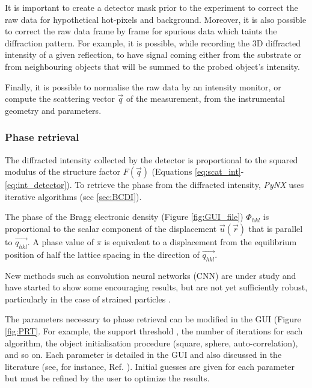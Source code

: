 It is important to create a detector mask prior to the experiment to correct the raw data for hypothetical hot-pixels and background.
Moreover, it is also possible to correct the raw data frame by frame for spurious data which taints the diffraction pattern.
For example, it is possible, while recording the 3D diffracted intensity of a given reflection, to have signal coming either from the substrate or from neighbouring objects that will be summed to the probed object's intensity.

Finally, it is possible to normalise the raw data by an intensity monitor, or compute the scattering vector $\vec{q}$ of the measurement, from the instrumental geometry and parameters.

\subsubsection{Phase retrieval}
The diffracted intensity collected by the detector is proportional to the squared modulus of the structure factor $F(\vec{q})$ (Equations \ref{eq:scat_int}-\ref{eq:int_detector}).
To retrieve the phase from the diffracted intensity, \textit{PyNX} uses iterative algorithms (sec \ref{sec:BCDI}).

The phase of the Bragg electronic density (Figure \ref{fig:GUI_file}) $\Phi_{hkl}$ is proportional to the scalar component of the displacement $\vec{u}(\vec{r})$ that is parallel to $ \vec{q_{hkl}}$. A phase value of $\pi$ is equivalent to a displacement from the equilibrium position of half the lattice spacing in the direction of $\vec{q_{hkl}}$.

New methods such as convolution neural networks (CNN) are under study and have started to show some encouraging results, but are not yet sufficiently robust, particularly in the case of strained particles \cite{cherukara_real-time_2018,chan_rapid_2021,Wu2021}.

The parameters necessary to phase retrieval can be modified in the GUI (Figure \ref{fig:PRT}.
For example, the support threshold
, the number of iterations for each algorithm, the object initialisation procedure (square, sphere, auto-correlation), and so on.
Each parameter is detailed in the GUI and also discussed in the literature (see, for instance, Ref. \cite{fienup_phase_1982,fienup_reconstruction_1978,marchesini_publishers_2007,pynx2020operators}). Initial guesses are given for each parameter but must be refined by the user to optimize the results.


